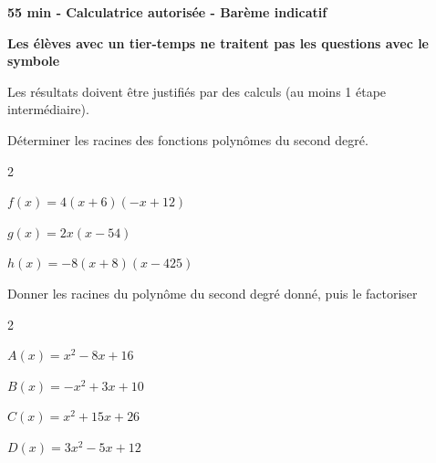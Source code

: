 \documentclass[12pt,a4paper]{article}  %
\begin{document}
\begin{center}

\end{center}




\begin{center}\textbf{55 min - Calculatrice autorisée - Barème indicatif}\end{center}

\begin{center}\textbf{Les élèves avec un tier-temps ne traitent pas les questions avec  le symbole }\end{center}

\begin{center}
Les résultats doivent être justifiés par des calculs (au moins 1 étape intermédiaire).
\end{center}
\vspace{.05cm} 


Déterminer les racines des fonctions polynômes du second degré.
\begin{multicols}{2}
\begin{enumMet}
    \item {} $f(x)=4(x+6)(-x+12)$
    \item $g(x)=2x(x-54)$
    \item $h(x)=-8(x+8)(x-425)$
\end{enumMet}
\end{multicols}

\vspace{-0.3cm}

Donner les racines du polynôme du second degré donné, puis le factoriser
\begin{multicols}{2}
\begin{enumMet}
    \item $A(x)=x^{2}-8 x+16$
    \item {} $B(x)=-x^{2}+3 x+10$
    \item $C(x)=x^{2}+15x+26$
    \item $D(x)=3 x^{2}-5 x+12$
\end{enumMet}
\end{multicols}
\end{document}
